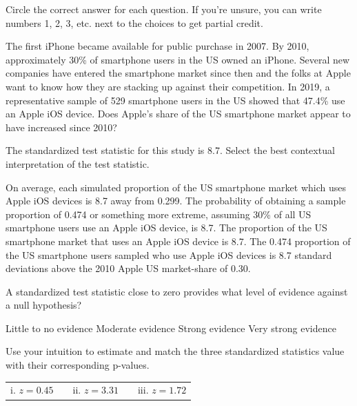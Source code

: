 \documentclass{article}
\begin{document}
	Circle the correct answer for each question.  If you're unsure, you can write numbers 1, 2, 3, etc. next to the choices to get partial credit.\\[.5cm]
	\begin{mcquestions}
		\question The first iPhone became available for public purchase in 2007.  By 2010, approximately 30\% of smartphone users in the US owned an iPhone.  Several new companies have entered the smartphone market since then and the folks at Apple want to know how they are stacking up against their competition.  In 2019, a representative sample of 529 smartphone users in the US showed that 47.4\% use an Apple iOS device.  Does Apple's share of the US smartphone market appear to have increased since 2010?
		
		The standardized test statistic for this study is 8.7. Select the best contextual interpretation of the test statistic.

		\begin{mcanswerslist}
			\answer On average, each simulated proportion of the US smartphone market which uses Apple iOS devices is 8.7 away from 0.299.
			\answer The probability of obtaining a sample proportion of 0.474 or something more extreme, assuming 30\% of all US smartphone users use an Apple iOS device, is 8.7.
			\answer The proportion of the US smartphone market that uses an Apple iOS device is 8.7.
			\answer[correct] The 0.474 proportion of the US smartphone users sampled who use Apple iOS devices is 8.7 standard deviations above the 2010 Apple US market-share of 0.30.
		\end{mcanswerslist}
		
		\question A standardized test statistic close to zero provides what level of evidence against a null hypothesis?
		\begin{mcanswerslist}
			\answer[correct] Little to no evidence
			\answer Moderate evidence
			\answer Strong evidence
			\answer Very strong evidence
		\end{mcanswerslist}
		
		\question Use your intuition to estimate and match the three standardized statistics value with their corresponding p-values.
		
		\begin{tabular}{lp{1in}cp{1in}r}
			i. $z=0.45$ && ii. $z=3.31$ && iii. $z=1.72$
		\end{tabular}
		

\end{mcquestions}
\end{document}
